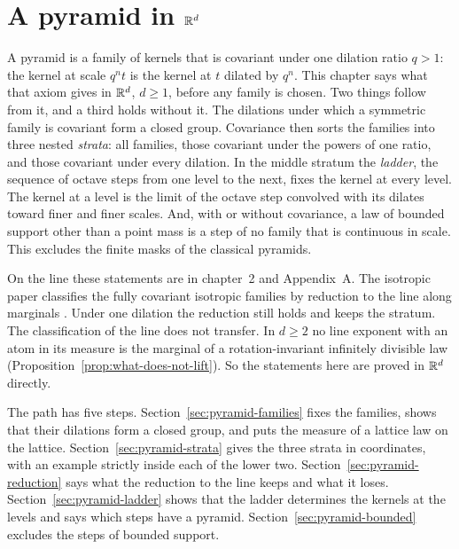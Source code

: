 \chapter{A pyramid in $\mathbb{R}^d$}
\label{ch:pyramid}

A pyramid is a family of kernels that is covariant under one dilation ratio $q > 1$: the kernel at
scale $q^nt$ is the kernel at $t$ dilated by $q^n$. This chapter says what that axiom gives in
$\mathbb{R}^d$, $d \ge 1$, before any family is chosen. Two things follow from it, and a third holds
without it. The dilations under which a symmetric family is covariant form a closed group.
Covariance then sorts the families into three nested \emph{strata}: all families, those covariant
under the powers of one ratio, and those covariant under every dilation. In the middle stratum the \emph{ladder}, the sequence of octave steps from one level
to the next, fixes the kernel at every level. The kernel at a level is the limit of the octave step
convolved with its dilates toward finer and finer scales. And, with or without covariance, a law of
bounded support other than a point mass is a step of no family that is continuous in scale. This excludes the finite masks of the classical
pyramids.

On the line these statements are in chapter~2 and Appendix~A. The isotropic paper classifies the
fully covariant isotropic families by reduction to the line along marginals
. Under one dilation the reduction still holds and keeps the
stratum. The classification of the line does not transfer. In $d \ge 2$ no line exponent with an
atom in its \Levy{} measure is the marginal of a rotation-invariant infinitely divisible law
(Proposition~\ref{prop:what-does-not-lift}). So the statements here
are proved in $\mathbb{R}^d$ directly.

The path has five steps. Section~\ref{sec:pyramid-families} fixes the families, shows that their
dilations form a closed group, and puts the \Levy{} measure of a lattice law on the lattice.
Section~\ref{sec:pyramid-strata} gives the three strata in \Levy{} coordinates, with an example
strictly inside each of the lower two. Section~\ref{sec:pyramid-reduction} says what the reduction
to the line keeps and what it loses. Section~\ref{sec:pyramid-ladder} shows that the ladder
determines the kernels at the levels and says which steps have a pyramid.
Section~\ref{sec:pyramid-bounded} excludes the steps of bounded support.

